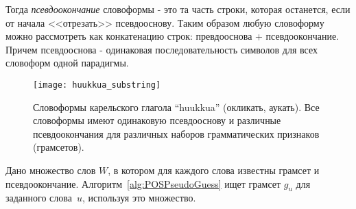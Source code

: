 Тогда \emph{псевдоокончание} словоформы - это та часть строки, которая останется, если от начала <<отрезать>> псевдооснову.  
Таким образом любую словоформу можно рассмотреть как конкатенацию строк: превдооснова + псевдоокончание. 
Причем псевдооснова - одинаковая последовательность символов для всех словоформ одной парадигмы.

\begin{figure}
    \centering
    \texttt{[image: huukkua\_substring]}
    \caption{Словоформы карельского глагола ``huukkua'' (окликать, аукать). 
    Все словоформы имеют одинаковую псевдооснову и различные псевдоокончания 
    для различных наборов грамматических признаков (грамсетов).} 
    \label{fig:huukkua_substring}
\end{figure}

Дано множество слов $W$,  в котором для каждого слова известны грамсет и псевдоокончание. Алгоритм~\ref{alg:POSPseudoGuess} ищет грамсет $g_u$ для заданного слова~$u$, используя это множество.

